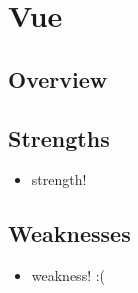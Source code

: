 \section{Vue}
\label{sec:vue}

\subsection{Overview}
\label{subsec:vue:overview}

\subsection{Strengths}
\label{subsec:vue:strengths}
\begin{itemize}
    \item strength! 
\end{itemize}

\subsection{Weaknesses}
\label{subsec:vue:weaknesses}
\begin{itemize}
    \item weakness! :( 
\end{itemize}